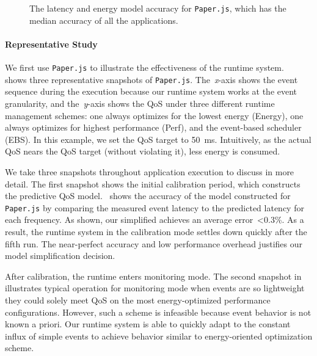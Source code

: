 \begin{figure}[t]
        \caption{\small The latency and energy model accuracy for \texttt{Paper.js}, which has the median accuracy of all the applications.}
        \label{fig:model_pred}
\end{figure}

\paragraph{Representative Study} We first use \texttt{Paper.js} to illustrate the effectiveness of the runtime system.~ shows three representative snapshots of \texttt{Paper.js}. The~\textit{x}-axis shows the event sequence during the execution because our runtime system works at the event granularity, and the~\textit{y}-axis shows the QoS under three different runtime management schemes: one always optimizes for the lowest energy (Energy), one always optimizes for highest performance (Perf), and the event-based scheduler (EBS). In this example, we set the QoS target to 50~ms. Intuitively, as the actual QoS nears the QoS target (without violating it), less energy is consumed.

We take three snapshots throughout application execution to discuss in more detail. The first snapshot shows the initial calibration period, which constructs the predictive QoS model.~ shows the accuracy of the model constructed for \texttt{Paper.js} by comparing the measured event latency to the predicted latency for each frequency. As shown, our simplified achieves an average error~\textless 0.3\%. As a result, the runtime system in the calibration mode settles down quickly after the fifth run. The near-perfect accuracy and low performance overhead justifies our model simplification decision.

After calibration, the runtime enters monitoring mode. The second snapshot in~ illustrates typical operation for monitoring mode when events are so lightweight they could solely meet QoS on the most energy-optimized performance configurations. However, such a scheme is infeasible because event behavior is not known a priori. Our runtime system is able to quickly adapt to the constant influx of simple events to achieve behavior similar to energy-oriented optimization scheme.


